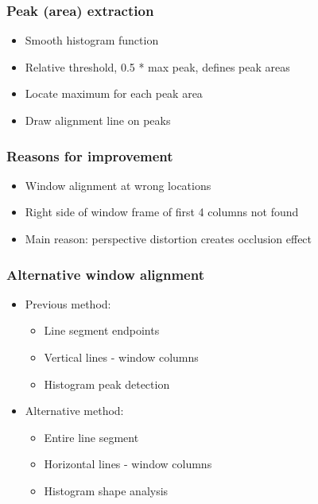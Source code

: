 \documentclass{beamer}
\begin{document}
\frame
{
	\frametitle{Peak (area) extraction}
	\begin{itemize}
	\item <+-| alert@+> Smooth histogram function 
	\item <+-| alert@+> Relative threshold, 0.5 * max peak, defines peak areas
	\item <+-| alert@+> Locate maximum for each peak area
	\item <+-| alert@+> Draw alignment line on peaks
	\end{itemize}
}


\frame
{
	\frametitle{Reasons for improvement}
	\begin{itemize}
	\item Window alignment at wrong locations
	\item Right side of window frame of first 4 columns not found
	\item Main reason: perspective distortion creates occlusion effect
	\end{itemize}
}

\frame
{
}

\frame
{
	\frametitle{Alternative window alignment}
	\begin{itemize}
	\item <+-| alert@+> Previous method: 
		\begin{itemize}
		\item <+-| alert@+> Line segment endpoints
		\item <+-| alert@+> Vertical lines - window columns
		\item <+-| alert@+> Histogram peak detection
		\end{itemize}
	\item <+-| alert@+> Alternative method: 
		\begin{itemize}
		\item <+-| alert@+> Entire line segment
		\item <+-| alert@+> Horizontal lines - window columns
		\item <+-| alert@+> Histogram shape analysis
		\end{itemize}
	\end{itemize}
}
\end{document}
